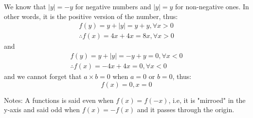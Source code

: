 \documentclass{article}
\begin{document}
We know that $|y| = -y$ for negative numbers and $|y| = y$ for non-negative ones. In other words, it is the positive version of the number, thus:
\begin{equation}
\begin{split}
    f(y) = y + |y| = y + y, \forall x > 0 \\
    \therefore f(x) = 4x + 4x = 8x, \forall x > 0
\end{split}
\end{equation}
and
\begin{equation}
\begin{split}
    f(y) = y + |y| = -y + y = 0, \forall x < 0 \\
    \therefore f(x) = -4x + 4x = 0 , \forall x < 0
\end{split}
\end{equation}
and we cannot forget that $a \times b = 0$ when $a=0$ or $b=0$, thus:
\begin{equation}
f(x) = 0, x = 0
\end{equation}
\newline\newline
Notes: A functions is said even when $f(x) = f(-x)$, i.e, it is "mirroed" in the y-axis and said odd when $f(x) = -f(x)$ and it passes through the origin.
\end{document}
